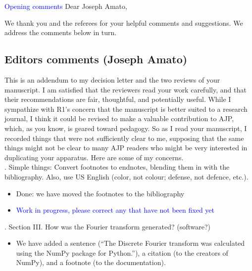 \documentclass{article}
\newcommand{\todo}{\textcolor{blue}}
\begin{document}
\todo{Opening comments}
Dear Joseph Amato, 

We thank you and the referees for your helpful comments and suggestions. 
We address the comments below in turn. 

\subsection*{Editors comments (Joseph Amato)}

This is an addendum to my decision letter and the two reviews of your manuscript.  I am satisfied that the reviewers read your work carefully, and that their recommendations are fair, thoughtful, and potentially useful.  While I sympathize with R1’s concern that the manuscript is better suited to a research journal, I think it could be revised to make a valuable contribution to AJP, which, as you know, is geared toward pedagogy.  So as I read your manuscript, I recorded things that were not sufficiently clear to me, supposing that the same things might not be clear to many AJP readers who might be very interested in duplicating your apparatus.  Here are some of my concerns.  \\

. Simple things: Convert footnotes to endnotes, blending them in with the bibliography.  Also, use US English (color, not colour; defense, not defence, etc.). 
\begin{itemize}
\item Done: we have moved the footnotes to the bibliography
\item \todo{Work in progress, please correct any that have not been fixed yet}
\end{itemize}

. Section III.  How was the Fourier transform generated?  (software?)
\begin{itemize}
\item We have added a sentence (``The Discrete Fourier transform was calculated using the NumPy package for Python.''), a citation (to the creators of NumPy), and a footnote (to the documentation).
\end{itemize}
\end{document}
